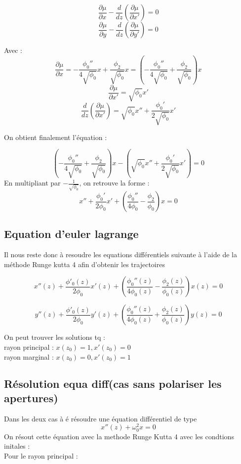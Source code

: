 \documentclass{report}
\begin{document}
\[
\frac{\partial \mu }{\partial x}-\frac{d}{dz}\left(\frac{\partial \mu }{\partial x'}\right)=0
\]
\[
\frac{\partial \mu }{\partial y}-\frac{d}{dz}\left(\frac{\partial \mu }{\partial y'}\right)=0
\]

Avec :
\[
\frac{\partial \mu }{\partial x} = -\frac{\phi_0''}{4\sqrt{\phi_0}}x + \frac{\phi_2}{\sqrt{\phi_0}}x = \left(- \frac{\phi_0''}{4\sqrt{\phi_0}} + \frac{\phi_2}{\sqrt{\phi_0}} \right) x
\]
\[
\frac{\partial \mu }{\partial x'} = \sqrt{\phi_0}x'
\]
\[
\frac{d}{dz} \left( \frac{\partial \mu}{\partial x'} \right) = \sqrt{\phi_0}x'' + \frac{\phi_0'}{2\sqrt{\phi_0}}x'
\]

On obtient finalement l'équation :

\[
\left( -\frac{\phi_0''}{4\sqrt{\phi_0}} + \frac{\phi_2}{\sqrt{\phi_0}} \right) x - \left( \sqrt{\phi_0}x'' + \frac{\phi_0'}{2\sqrt{\phi_0}}x' \right) = 0
\]
En multipliant par $-\frac{1}{\sqrt{\phi_0}}$, on retrouve la forme :
\[
x'' + \frac{\phi_0'}{2\phi_0}x' + \left( \frac{\phi_0''}{4\phi_0} - \frac{\phi_2}{\phi_0} \right)x = 0
\]






\subsection{Equation d'euler lagrange }
Il nous reste donc à resoudre les equations différentiels suivante à l'aide de la méthode Runge 
kutta 4 afin d'obtenir les trajectoires

\[
x''(z) + \frac{\phi'_0(z)}{2\phi_0}x'(z) + \left( \frac{\phi_0''(z)}{4\phi_0(z)} -
\frac{\phi_2(z)}{\phi_0(z)}\right) x(z) = 0
\]

\[
y''(z) + \frac{\phi'_0(z)}{2\phi_0}y'(z) + \left(\frac{\phi_0''(z)}{4\phi_0(z)} +
\frac{\phi_2(z)}{\phi_0(z)}\right) y(z) = 0
\]


On peut trouver les solutions tq :
\\
 rayon principal : $x(z_0) = 1, x'(z_0) = 0$
\\
 rayon marginal : $ x(z_0) = 0, x'(z_0) = 1$



\subsection{Résolution equa diff(cas sans polariser les apertures)}
Dans les deux cas à é résoudre une équation différentiel de type 
\[
x''(z) + \omega_0^2 x = 0
\]
On résout cette équation avec la methode Runge Kutta 4 avec les condtions initales :\\
Pour le rayon principal :
\end{document}
